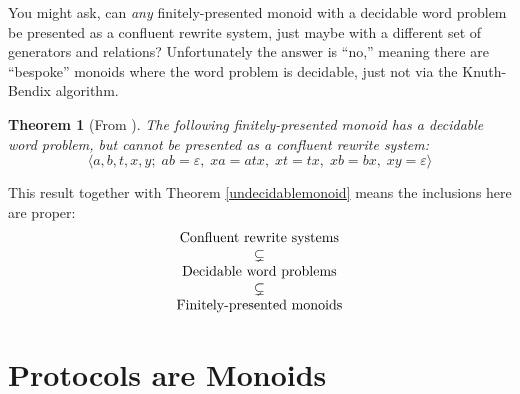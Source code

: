 \documentclass[headsepline,bibliography=totoc]{scrreport}
\newtheorem{theorem}{Theorem}[chapter]
\theoremstyle{definition}
\theoremstyle{definition}
\theoremstyle{definition}
\begin{document}
You might ask, can \emph{any} finitely-presented monoid with a decidable word problem be presented as a confluent rewrite system, just maybe with a different set of generators and relations? Unfortunately the answer is ``no,'' meaning there are ``bespoke'' monoids where the word problem is decidable, just not via the Knuth-Bendix algorithm.
\begin{theorem}[From \cite{SQUIER1994271}] The following finitely-presented monoid has a decidable word problem, but cannot be presented as a confluent rewrite system:
\[\langle a, b, t, x, y;\; ab=\varepsilon,\; xa=atx,\; xt=tx,\; xb=bx,\; xy=\varepsilon\rangle\]
\end{theorem}
This result together with Theorem \ref{undecidablemonoid} means the inclusions here are proper:
\[
\begin{array}{c}
\hbox{Confluent rewrite systems} \\
\subsetneq \\
\hbox{Decidable word problems} \\
\subsetneq \\
\hbox{Finitely-presented monoids}
\end{array}
\]

\chapter{Protocols are Monoids}\label{protocolsasmonoids}
\end{document}
